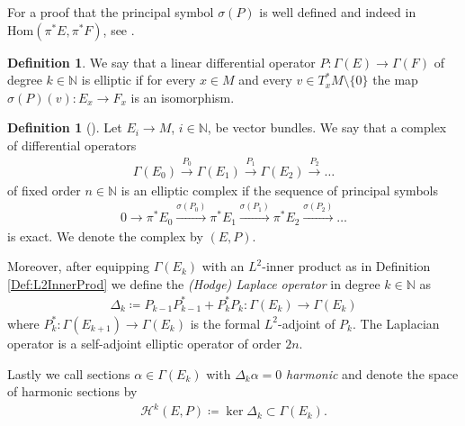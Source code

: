 \documentclass[12pt,a4paper]{article}
\theoremstyle{plain}
\theoremstyle{definition}
\newtheorem{definition}[theorem]{Definition}
\newcommand{\N}{\mathbb{N}}
\newcommand{\Hcal}{\mathcal{H}}
\begin{document}
For a proof that the principal symbol $\sigma(P)$ is well defined and indeed in $\mathrm{Hom}(\pi^*E,\pi^*F)$, see \cite[Chapter IV, Proposition 2.3]{Wells07}.

\begin{definition}
We say that a linear differential operator $P:\Gamma(E)\to \Gamma(F)$ of degree $k\in \N$ is elliptic if for every $x\in M$ and every $v\in T_x^*M\setminus\{0\}$ the map $\sigma(P)(v):E_x\to F_x$ is an isomorphism.
\end{definition}

\begin{definition}[{\cite[§4, p.~144-146]{Wells07}}]
Let $E_i\to M$, $i\in \N$, be vector bundles.
We say that a complex of differential operators 
\begin{align*}
    \Gamma(E_0)\xrightarrow{P_0}\Gamma(E_1)\xrightarrow{P_1}\Gamma(E_2)\xrightarrow{P_2}\ldots
\end{align*}
of fixed order $n\in \N$ is an elliptic complex if the sequence of principal symbols
\begin{align*}
    0\to \pi^*E_0\xrightarrow{\sigma(P_0)}\pi^*E_1\xrightarrow{\sigma(P_1)}\pi^*E_2\xrightarrow{\sigma(P_2)}\ldots
\end{align*}
is exact. 
We denote the complex by $(E,P)$.

Moreover, after equipping $\Gamma(E_k)$ with an $L^2$-inner product as in Definition \ref{Def:L2InnerProd} we define the \textit{(Hodge) Laplace operator} in degree $k\in \N$ as
\begin{align*}
    \Delta_k\coloneqq P_{k-1}P^*_{k-1}+P_k^* P_k:\Gamma(E_k)\to \Gamma(E_k)
\end{align*}
where $P^*_k:\Gamma(E_{k+1})\to \Gamma(E_k)$ is the formal $L^2$-adjoint of $P_k$.
The Laplacian operator is a self-adjoint elliptic operator of order $2n$.

Lastly we call sections $\alpha\in \Gamma(E_k)$ with $\Delta_k\alpha=0$ \textit{harmonic} and denote the space of harmonic sections by
\begin{align*}
    \Hcal^k(E,P)\coloneqq \ker \Delta_k \subset \Gamma(E_k).
\end{align*}
\end{definition}
\end{document}
